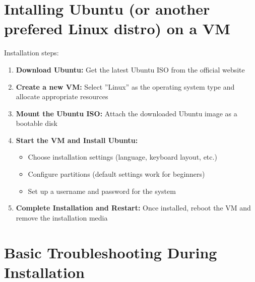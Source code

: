 \section{Intalling Ubuntu (or another prefered Linux distro) on a VM}
Installation steps:

\begin{enumerate}

    \item \textbf{Download Ubuntu:} Get the latest Ubuntu ISO from the official website

    \item \textbf{Create a new VM:} Select ”Linux” as the operating system type and allocate appropriate resources

    \item \textbf{Mount the Ubuntu ISO:} Attach the downloaded Ubuntu image as a bootable disk

    \item \textbf{Start the VM and Install Ubuntu:}
    \begin{itemize}

        \item Choose installation settings (language, keyboard layout, etc.)

        \item Configure partitions (default settings work for beginners)

        \item Set up a username and password for the system
        
    \end{itemize}

    \item \textbf{Complete Installation and Restart:} Once installed, reboot the VM and remove the installation media

\end{enumerate}

\section{Basic Troubleshooting During Installation}


